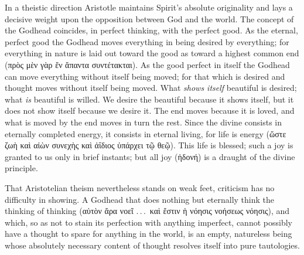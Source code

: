 \documentclass[12pt,a4paper]{book}
\begin{document}
In a theistic direction Aristotle maintains Spirit's absolute originality and lays a decisive weight
upon the opposition between God and the world. The concept of the Godhead coincides, in perfect
thinking, with the perfect good. As the eternal, perfect good the Godhead moves everything in being
desired by everything; for everything in nature is laid out toward the good as toward a highest
common end (πρὸς μὲν γὰρ ἕν ἅπαντα συντέτακται). As the good perfect in itself the Godhead can move
everything without itself being moved; for that which is desired and thought moves without itself
being moved. What \emph{shows itself} beautiful is desired; what \emph{is} beautiful is willed. We
desire the beautiful because it shows itself, but it does not show itself because we desire it. The
end moves because it is loved, and what is moved by the end moves in turn the rest. Since the divine
consists in eternally completed energy, it consists in eternal living, for life is energy (ὥστε ζωὴ
καὶ αἰὼν συνεχὴς καὶ ἀΐδιος ὑπάρχει τῷ θεῷ). This life is blessed; such a joy is granted to us only
in brief instants; but all joy (ἡδονή) is a draught of the divine principle.

That Aristotelian theism nevertheless stands on weak feet, criticism has no difficulty in showing. A
Godhead that does nothing but eternally
think the thinking of thinking (αὑτὸν ἄρα νοεῖ .\,.\,.\ καὶ ἔστιν ἡ νόησις νοήσεως νόησις), and which,
so as not to stain its perfection with anything imperfect, cannot possibly have a thought to spare for
anything in the world, is an empty, natureless being whose absolutely necessary content of thought
resolves itself into pure tautologies.
\end{document}
